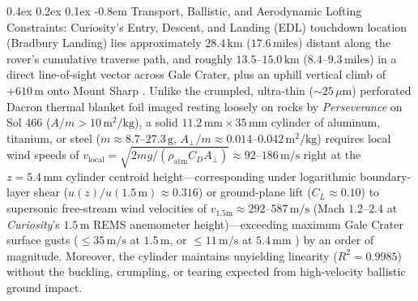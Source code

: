 \documentclass[11pt,a4paper]{article}
\makeatletter
\renewcommand\paragraph{\@startsection{paragraph}{4}{\z@}%
                                    {0.4ex \@plus 0.2ex \@minus 0.1ex}%
                                    {-0.8em}%
                                    {\normalfont\normalsize\bfseries}}
\makeatother
\begin{document}
\paragraph{Transport, Ballistic, and Aerodynamic Lofting Constraints:} Curiosity's Entry, Descent, and Landing (EDL) touchdown location (Bradbury Landing) lies approximately $28.4\,\text{km}$ ($17.6\,\text{miles}$) distant along the rover's cumulative traverse path, and roughly $13.5\text{--}15.0\,\text{km}$ ($8.4\text{--}9.3\,\text{miles}$) in a direct line-of-sight vector across Gale Crater, plus an uphill vertical climb of $+610\,\text{m}$ onto Mount Sharp \cite{vasavada2014,kornfeld2014}. Unlike the crumpled, ultra-thin ($\sim 25\,\mu\text{m}$) perforated Dacron thermal blanket foil imaged resting loosely on rocks by \textit{Perseverance} on Sol 466 ($A/m > 10\,\text{m}^2/\text{kg}$), a solid $11.2\,\text{mm} \times 35\,\text{mm}$ cylinder of aluminum, titanium, or steel ($m \approx 8.7\text{--}27.3\,\text{g}$, $A_\perp/m \approx 0.014\text{--}0.042\,\text{m}^2/\text{kg}$) requires local wind speeds of $v_{\text{local}} = \sqrt{2mg / (\rho_{\text{atm}} C_D A_\perp)} \approx 92\text{--}186\,\text{m/s}$ right at the $z = 5.4\,\text{mm}$ cylinder centroid height---corresponding under logarithmic boundary-layer shear ($u(z)/u(1.5\,\text{m}) \approx 0.316$) or ground-plane lift ($C_L \approx 0.10$) to supersonic free-stream wind velocities of $v_{1.5\text{m}} \approx 292\text{--}587\,\text{m/s}$ (Mach $1.2\text{--}2.4$ at \textit{Curiosity}'s $1.5\,\text{m}$ REMS anemometer height)---exceeding maximum Gale Crater surface gusts ($\le 35\,\text{m/s}$ at $1.5\,\text{m}$, or $\le 11\,\text{m/s}$ at $5.4\,\text{mm}$ \cite{viudez2019}) by an order of magnitude. Moreover, the cylinder maintains unyielding linearity ($R^2 = 0.9985$) without the buckling, crumpling, or tearing expected from high-velocity ballistic ground impact.
\end{document}
